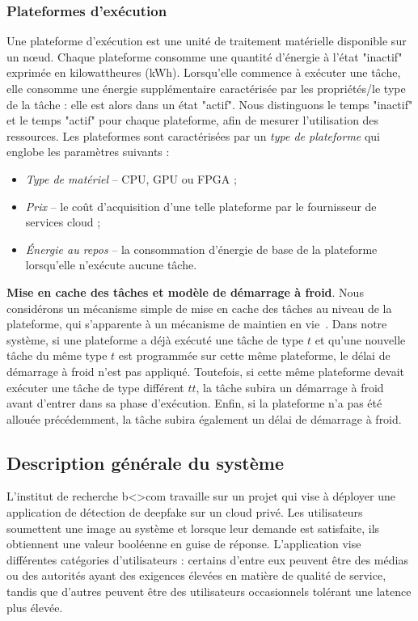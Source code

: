 \subsubsection{Plateformes d'exécution}
\label{model:platforms}

Une plateforme d'exécution est une unité de traitement matérielle disponible sur un nœud. Chaque plateforme consomme une quantité d'énergie à l'état "inactif" exprimée en kilowattheures (kWh). Lorsqu'elle commence à exécuter une tâche, elle consomme une énergie supplémentaire caractérisée par les propriétés/le type de la tâche : elle est alors dans un état "actif". Nous distinguons le temps "inactif" et le temps "actif" pour chaque plateforme, afin de mesurer l'utilisation des ressources.
Les plateformes sont caractérisées par un \textit{type de plateforme} qui englobe les paramètres suivants :

\begin{itemize}
    \item \textit{Type de matériel} -- CPU, GPU ou FPGA ;
    \item \textit{Prix} -- le coût d'acquisition d'une telle plateforme par le fournisseur de services cloud ;
    \item \textit{Énergie au repos} -- la consommation d'énergie de base de la plateforme lorsqu'elle n'exécute aucune tâche.
\end{itemize}

\textbf{Mise en cache des tâches et modèle de démarrage à froid}. Nous considérons un mécanisme simple de mise en cache des tâches au niveau de la plateforme, qui s'apparente à un mécanisme de maintien en vie~\cite{7279063}. Dans notre système, si une plateforme a déjà exécuté une tâche de type $t$ et qu'une nouvelle tâche du même type $t$ est programmée sur cette même plateforme, le délai de démarrage à froid n'est pas appliqué. Toutefois, si cette même plateforme devait exécuter une tâche de type différent $tt$, la tâche subira un démarrage à froid avant d'entrer dans sa phase d'exécution. Enfin, si la plateforme n'a pas été allouée précédemment, la tâche subira également un délai de démarrage à froid.

\subsection{Description générale du système}

L'institut de recherche b{\textless\textgreater}com travaille sur un projet qui vise à déployer une application de détection de deepfake sur un cloud privé. Les utilisateurs soumettent une image au système et lorsque leur demande est satisfaite, ils obtiennent une valeur booléenne en guise de réponse. L'application vise différentes catégories d'utilisateurs : certains d'entre eux peuvent être des médias ou des autorités ayant des exigences élevées en matière de qualité de service, tandis que d'autres peuvent être des utilisateurs occasionnels tolérant une latence plus élevée.

